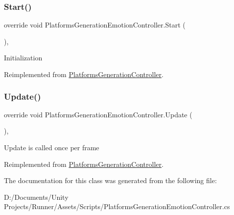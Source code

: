 \subsubsection{\texorpdfstring{Start()}{Start()}}
{\footnotesize\ttfamily override void Platforms\+Generation\+Emotion\+Controller.\+Start (\begin{DoxyParamCaption}{ }\end{DoxyParamCaption})\hspace{0.3cm}{\ttfamily [protected]}, {\ttfamily [virtual]}}

Initialization 

Reimplemented from \mbox{\hyperlink{class_platforms_generation_controller_a3bc338f320d39a1a549648d2ce11074d}{Platforms\+Generation\+Controller}}.

\mbox{\label{class_platforms_generation_emotion_controller_a9df024fe907661ae1f126782f84a76fd}} 
\subsubsection{\texorpdfstring{Update()}{Update()}}
{\footnotesize\ttfamily override void Platforms\+Generation\+Emotion\+Controller.\+Update (\begin{DoxyParamCaption}{ }\end{DoxyParamCaption})\hspace{0.3cm}{\ttfamily [protected]}, {\ttfamily [virtual]}}

Update is called once per frame 

Reimplemented from \mbox{\hyperlink{class_platforms_generation_controller_ad014a93027f02d91fb93698b8f872606}{Platforms\+Generation\+Controller}}.



The documentation for this class was generated from the following file\+:\begin{DoxyCompactItemize}
\item 
D\+:/\+Documents/\+Unity Projects/\+Runner/\+Assets/\+Scripts/Platforms\+Generation\+Emotion\+Controller.\+cs\end{DoxyCompactItemize}
